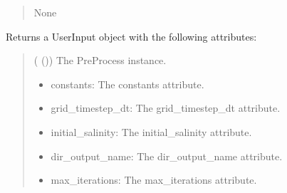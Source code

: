 \documentclass[a4paper,11pt,english,openany]{sphinxmanual}
\begin{document}
\begin{fulllineitems}
\begin{fulllineitems}
\begin{quote}
\begin{description}
\sphinxAtStartPar
None

\end{description}\end{quote}

\end{fulllineitems}


\begin{fulllineitems}
\label{\detokenize{api/spyice.preprocess.pre_process:spyice.preprocess.pre_process.PreProcess.get_userinput}}
\pysigstartsignatures
{}
\pysigstopsignatures
\sphinxAtStartPar
Returns a UserInput object with the following attributes:
\begin{quote}\begin{description}
\sphinxAtStartPar
{} ({\hyperref[\detokenize{api/spyice.preprocess.pre_process:spyice.preprocess.pre_process.PreProcess}]{}} ()) \textendash{} The PreProcess instance.

\sphinxAtStartPar
\begin{description}
\begin{itemize}
\item {} 
\sphinxAtStartPar
constants: The constants attribute.

\item {} 
\sphinxAtStartPar
grid\_timestep\_dt: The grid\_timestep\_dt attribute.

\item {} 
\sphinxAtStartPar
initial\_salinity: The initial\_salinity attribute.

\item {} 
\sphinxAtStartPar
dir\_output\_name: The dir\_output\_name attribute.

\item {} 
\sphinxAtStartPar
max\_iterations: The max\_iterations attribute.

\end{itemize}

\end{description}



\end{description}
\end{quote}
\end{fulllineitems}
\end{fulllineitems}
\end{document}

